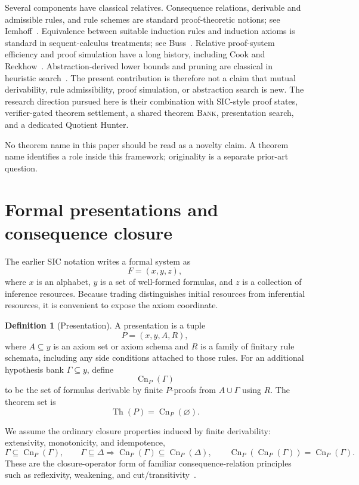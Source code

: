 \documentclass[11pt]{article}
\theoremstyle{definition}
\newtheorem{definition}[theorem]{Definition}
\theoremstyle{remark}
\newcommand{\Cn}{\operatorname{Cn}}
\newcommand{\Th}{\operatorname{Th}}
\newcommand{\BANK}{\textsc{Bank}}
\begin{document}
Several components have classical relatives. Consequence relations, derivable and admissible rules, and rule schemes are standard proof-theoretic notions; see Iemhoff~\cite{Iemhoff2016}. Equivalence between suitable induction rules and induction axioms is standard in sequent-calculus treatments; see Buss~\cite{Buss1998}. Relative proof-system efficiency and proof simulation have a long history, including Cook and Reckhow~\cite{CookReckhow1979}. Abstraction-derived lower bounds and pruning are classical in heuristic search~\cite{Hart1968,MostowPrieditis1989,Holte1996}. The present contribution is therefore not a claim that mutual derivability, rule admissibility, proof simulation, or abstraction search is new. The research direction pursued here is their combination with SIC-style proof states, verifier-gated theorem settlement, a shared theorem \BANK{}, presentation search, and a dedicated Quotient Hunter.

No theorem name in this paper should be read as a novelty claim. A theorem name identifies a role inside this framework; originality is a separate prior-art question.

\section{Formal presentations and consequence closure}
The earlier SIC notation writes a formal system as
\[
F=(x,y,z),
\]
where $x$ is an alphabet, $y$ is a set of well-formed formulas, and $z$ is a collection of inference resources. Because trading distinguishes initial resources from inferential resources, it is convenient to expose the axiom coordinate.

\begin{definition}[Presentation]
A presentation is a tuple
\[
P=(x,y,A,R),
\]
where $A\subseteq y$ is an axiom set or axiom schema and $R$ is a family of finitary rule schemata, including any side conditions attached to those rules. For an additional hypothesis bank $\Gamma\subseteq y$, define
\[
\Cn_P(\Gamma)
\]
to be the set of formulas derivable by finite $P$-proofs from $A\cup\Gamma$ using $R$. The theorem set is
\[
\Th(P)=\Cn_P(\varnothing).
\]
\end{definition}

We assume the ordinary closure properties induced by finite derivability: extensivity, monotonicity, and idempotence,
\[
\Gamma\subseteq\Cn_P(\Gamma),\qquad
\Gamma\subseteq\Delta\Rightarrow\Cn_P(\Gamma)\subseteq\Cn_P(\Delta),\qquad
\Cn_P(\Cn_P(\Gamma))=\Cn_P(\Gamma).
\]
These are the closure-operator form of familiar consequence-relation principles such as reflexivity, weakening, and cut/transitivity~\cite{Iemhoff2016}.
\end{document}
